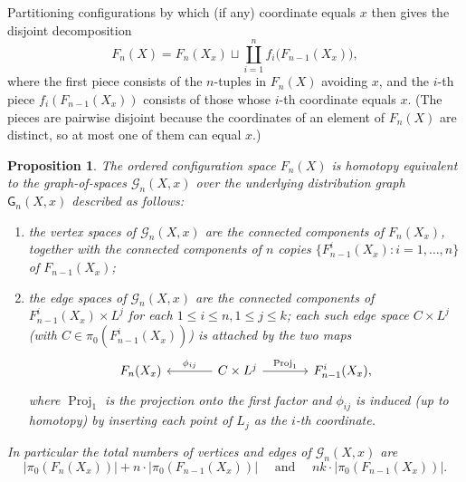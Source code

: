 \documentclass[reqno]{amsart}
\newtheorem{proposition}[theorem]{Proposition}
\theoremstyle{definition}
\newcommand\cG{\mathcal{G}}
\newcommand\sfG{\mathsf{G}}
\DeclareMathOperator{\proj}{Proj}
\numberwithin{equation}{section}
\begin{document}
Partitioning configurations by which (if any) coordinate equals
\(x\) then gives the disjoint decomposition
\[
F_n(X)
=
F_n(X_x) \sqcup
\coprod_{i=1}^n f_i\bigl(F_{n-1}(X_x)\bigr),
\]
where the first piece consists of the \(n\)-tuples in \(F_n(X)\)
avoiding \(x\), and the \(i\)-th piece \(f_i(F_{n-1}(X_x))\) consists
of those whose \(i\)-th coordinate equals \(x\). (The pieces are
pairwise disjoint because the coordinates of an element of
\(F_n(X)\) are distinct, so at most one of them can equal \(x\).)


\begin{proposition}\label{prop:valency-decomp}
The ordered configuration space \(F_n(X)\) is homotopy equivalent to the \emph{graph-of-spaces}
\(\cG_n(X,x)\) over the underlying \emph{distribution graph} \(\sfG_n(X,x)\) described as follows:
\begin{enumerate}[label=(\roman*),leftmargin=2em]
    \item the vertex spaces of \(\cG_n(X,x)\) are the connected
          components of \(F_n(X_x)\), together with the connected
          components of \(n\) copies
          \(\{F_{n-1}^i(X_x):i=1,\dots,n\}\) of \(F_{n-1}(X_x)\);
    \item the edge spaces of \(\cG_n(X,x)\) are the connected
          components of \(F_{n-1}^i(X_x)\times L^j\) for each \(1\le i\le n, 1\le j\le k\); each such edge space
          \(C\times L^j\) (with \(C\in\pi_0(F_{n-1}^i(X_x))\)) is
          attached by the two maps
          \[
            \begin{tikzcd}[column sep=large]
              F_n(X_x) &
              C\times L^j
                \arrow[l, "\phi_{ij}"']
                \arrow[r, "\proj_1"]
              & F_{n-1}^i(X_x),
            \end{tikzcd}
          \]
          where \(\proj_1\) is the projection onto the
          first factor and \(\phi_{ij}\) is induced (up to homotopy)
          by inserting each point of \(L_j\) as the \(i\)-th
          coordinate.
\end{enumerate}
In particular the total numbers of vertices and edges of
\(\cG_n(X,x)\) are
\[
\bigl|\pi_0(F_n(X_x))\bigr|+n\cdot\bigl|\pi_0(F_{n-1}(X_x))\bigr|
\quad\text{ and }\quad
nk\cdot \bigl|\pi_0(F_{n-1}(X_x))\bigr|.
\]
\end{proposition}
\end{document}
